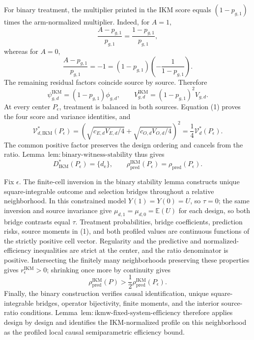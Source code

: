 For binary treatment, the multiplier printed in the IKM score equals \((1-p_{g,1})\) times the arm-normalized multiplier.  Indeed, for \(A=1\),
\[
\frac{A-p_{g,1}}{p_{g,1}}=\frac{1-p_{g,1}}{p_{g,1}},
\]
whereas for \(A=0\),
\[
\frac{A-p_{g,1}}{p_{g,1}}=-1
=(1-p_{g,1})\left(-\frac1{1-p_{g,1}}\right).
\]
The remaining residual factors coincide source by source.  Therefore
\[
\psi_{g,d}^{\mathrm{IKM}}=(1-p_{g,1})\phi_{g,d},\qquad
V_{g,d}^{\mathrm{IKM}}=(1-p_{g,1})^2V_{g,d}.                       \tag{1}
\]
At every center \(P_\epsilon\), treatment is balanced in both sources.  Equation (1) proves the four score and variance identities, and
\[
\mathcal V_{d,\mathrm{IKM}}^*(P_\epsilon)
=\left(\sqrt{c_{E,d}V_{E,d}/4}+\sqrt{c_{O,d}V_{O,d}/4}\right)^2
=\frac14\mathcal V_d^*(P_\epsilon).                               \tag{2}
\]
The common positive factor preserves the design ordering and cancels from the ratio.  Lemma~\(\mathrm{lem{:}binary\text{-}witness\text{-}stability}\) thus gives
\[
D_{\mathrm{IKM}}^*(P_\epsilon)=\{d_{\mathrm e}\},\qquad
\rho_{\mathrm{pred}}^{\mathrm{IKM}}(P_\epsilon)
=\rho_{\mathrm{pred}}(P_\epsilon).
\]

Fix \(\epsilon\).  The finite-cell inversion in the binary stability lemma constructs unique square-integrable outcome and selection bridges throughout a relative neighborhood.  In this constrained model \(Y(1)=Y(0)=U\), so \(\tau=0\); the same inversion and source invariance give \(\mu_{d,1}=\mu_{d,0}=\mathbb E(U)\) for each design, so both bridge contrasts equal \(\tau\).  Treatment probabilities, bridge coefficients, prediction risks, source moments in (1), and both profiled values are continuous functions of the strictly positive cell vector.  Regularity and the predictive and normalized-efficiency inequalities are strict at the center, and the ratio denominator is positive.  Intersecting the finitely many neighborhoods preserving these properties gives \(r_\epsilon^{\mathrm{IKM}}>0\); shrinking once more by continuity gives
\[
\rho_{\mathrm{pred}}^{\mathrm{IKM}}(P)
>\frac12\rho_{\mathrm{pred}}^{\mathrm{IKM}}(P_\epsilon).
\]
Finally, the binary construction verifies causal identification, unique square-integrable bridges, operator bijectivity, finite moments, and the interior source-ratio conditions.  Lemma~\(\mathrm{lem{:}ikmw\text{-}fixed\text{-}system\text{-}efficiency}\) therefore applies design by design and identifies the IKM-normalized profile on this neighborhood as the profiled local causal semiparametric efficiency bound.